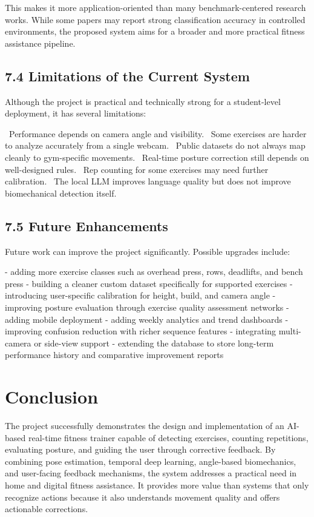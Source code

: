 \documentclass[12pt,a4paper]{report}
\begin{document}
This makes it more application-oriented than many benchmark-centered research works. While some papers may report strong classification accuracy in controlled environments, the proposed system aims for a broader and more practical fitness assistance pipeline.

\section{7.4 Limitations of the Current System}
Although the project is practical and technically strong for a student-level deployment, it has several limitations:

\noindent\textbullet\ Performance depends on camera angle and visibility.  
\noindent\textbullet\ Some exercises are harder to analyze accurately from a single webcam.  
\noindent\textbullet\ Public datasets do not always map cleanly to gym-specific movements.  
\noindent\textbullet\ Real-time posture correction still depends on well-designed rules.  
\noindent\textbullet\ Rep counting for some exercises may need further calibration.  
\noindent\textbullet\ The local LLM improves language quality but does not improve biomechanical detection itself.

\section{7.5 Future Enhancements}
Future work can improve the project significantly. Possible upgrades include:

- adding more exercise classes such as overhead press, rows, deadlifts, and bench press  
- building a cleaner custom dataset specifically for supported exercises  
- introducing user-specific calibration for height, build, and camera angle  
- improving posture evaluation through exercise quality assessment networks  
- adding mobile deployment  
- adding weekly analytics and trend dashboards  
- improving confusion reduction with richer sequence features  
- integrating multi-camera or side-view support  
- extending the database to store long-term performance history and comparative improvement reports


\chapter{Conclusion}

The project successfully demonstrates the design and implementation of an AI-based real-time fitness trainer capable of detecting exercises, counting repetitions, evaluating posture, and guiding the user through corrective feedback. By combining pose estimation, temporal deep learning, angle-based biomechanics, and user-facing feedback mechanisms, the system addresses a practical need in home and digital fitness assistance. It provides more value than systems that only recognize actions because it also understands movement quality and offers actionable corrections.
\end{document}
